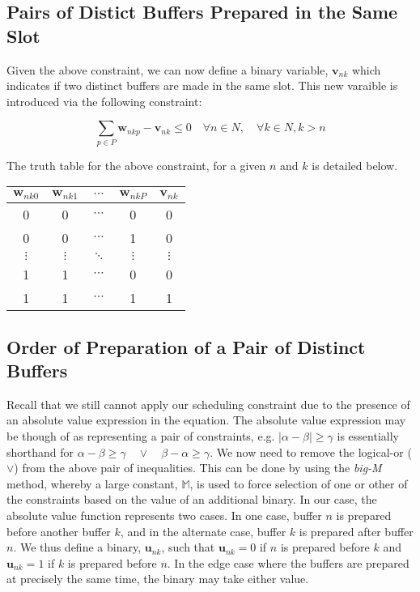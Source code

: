 \subsection{Pairs of Distict Buffers Prepared in the Same Slot}\label{SS.constr7}

Given the above constraint, we can now define a binary variable, 
$ \boldsymbol{v}_{nk} $ which indicates if two distinct buffers are made in the
same slot.
This new varaible is introduced via the following constraint:

\begin{equation}
    \sum_{p \in P} \boldsymbol{w}_{nkp} - \boldsymbol{v}_{nk} \le 0 \quad
    \forall n \in N, \quad \forall k \in N, k > n
\end{equation}

The truth table for the above constraint, for a given $n$ and $k$ is detailed
 below.

\begin{center}
    \begin{tabular}{c c c c | c}
        $\boldsymbol{w}_{nk0}$ & $\boldsymbol{w}_{nk1}$ & $\cdots$
        & $\boldsymbol{w}_{nkP}$ & $\boldsymbol{v}_{nk}$ \\ \hline
        0 & 0 & $\cdots$ & 0 & 0\\
        0 & 0 & $\cdots$ & 1 & 0\\
        $\vdots$ & $\vdots$ & $\ddots$ & $\vdots$ & $\vdots$\\
        1 & 1 & $\cdots$ & 0 & 0\\
        1 & 1 & $\cdots$ & 1 & 1\\
    \end{tabular}
\end{center}

\subsection{Order of Preparation of a Pair of Distinct Buffers}\label{SS.constr8}

Recall that we still cannot apply our scheduling constraint due to the presence
of an absolute value expression in the equation.
The absolute value expression may be though of as representing a pair of 
constraints, e.g.
$ \lvert \alpha - \beta \rvert \ge \gamma $
is essentially shorthand for
$ \alpha - \beta \ge \gamma \quad \lor \quad \beta - \alpha \ge \gamma $. 
We now need to remove the logical-or ($\lor$) from the above pair of
inequalities.
This can be done by using the \emph{big-M} method, whereby a large constant,
$ \mathbb{M} $, is used to force selection of one or other of the constraints
based on the value of an additional binary.
In our case, the absolute value function represents two cases.
In one case, buffer $n$ is prepared before another buffer $k$, and in the
alternate case, buffer $k$ is prepared after buffer $n$.
We thus define a binary, $\boldsymbol{u}_{nk}$, such that
$ \boldsymbol{u}_{nk} = 0 $ if $n$ is prepared before $k$ and
$ \boldsymbol{u}_{nk} = 1 $ if $k$ is prepared before $n$.
In the edge case where the buffers are prepared at precisely the same time,
the binary may take either value.

